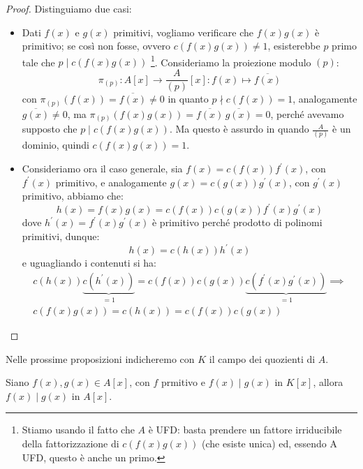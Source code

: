 \documentclass[11pt]{scrartcl}
\begin{document}
\begin{proof}
    Distinguiamo due casi:
    \begin{itemize}
        \item Dati $f(x)$ e $g(x)$ primitivi, vogliamo verificare che $f(x)g(x)$ è primitivo; 
            se così non fosse, ovvero $c(f(x)g(x)) \neq 1$, 
            esisterebbe $p$ primo tale che $p \mid c(f(x)g(x))$
	    \footnote{Stiamo usando il fatto che $A$ è UFD: basta prendere un fattore irriducibile della fattorizzazione di $c(f(x)g(x))$ (che esiste unica) ed, essendo A UFD, questo è anche un primo.}. 
	    Consideriamo la proiezione modulo $(p)$:
            \[ \pi_{(p)} : A[x] \longrightarrow \frac{A}{(p)}[x] : f(x) \longmapsto \overline{f(x)}
                \]
            con $\pi_{(p)}(f(x)) = \overline{f(x)} \neq 0$ in quanto $p \nmid c(f(x)) = 1$, analogamente $\overline{g(x)} \neq 0$, 
	    ma $\pi_{(p)}(f(x)g(x)) = \overline{f(x)}\,\overline{g(x)} = 0$, 
            perché avevamo supposto che $p \mid c(f(x)g(x))$. 
	    Ma questo è assurdo in quando $\displaystyle \frac{A}{(p)}$ è un dominio, quindi $c(f(x)g(x)) = 1$.
        \item Consideriamo ora il caso generale, sia $f(x) = c(f(x))f^{\prime}(x)$, con $f^{\prime}(x)$ primitivo, e analogamente $g(x) = c(g(x))g^{\prime}(x)$, con $g^{\prime}(x)$ primitivo, abbiamo che:
            \[ h(x) = f(x)g(x) = c(f(x))c(g(x))f^{\prime}(x)g^{\prime}(x)
                \]
            dove $h^{\prime}(x) = f^{\prime}(x)g^{\prime}(x)$ è primitivo perché prodotto di polinomi primitivi, dunque:
            \[ h(x) = c(h(x))h^{\prime}(x)
                \]
            e uguagliando i contenuti si ha:
            \begin{multline*}
                c(h(x))\underbrace{c(h^{\prime}(x))}_{= 1} = c(f(x))c(g(x))\underbrace{c(f^{\prime}(x)g^{\prime}(x))}_{= 1} \implies \\
                c(f(x)g(x)) = c(h(x)) = c(f(x))c(g(x))
            \end{multline*}
    \end{itemize}
\end{proof}

Nelle prossime proposizioni indicheremo con $K$ il campo dei quozienti di $A$.

\begin{corollary}
    \label{2.118}
    Siano $f(x),g(x) \in A[x]$, con $f$ prmitivo e $f(x) \mid g(x)$ in $K[x]$, allora $f(x) \mid g(x)$ in $A[x]$.
\end{corollary}
\end{document}
